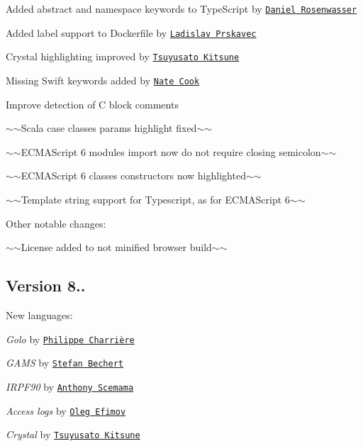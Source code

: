 \begin{DoxyItemize}
\item Added {\ttfamily abstract} and {\ttfamily namespace} keywords to Type\+Script by \href{https://github.com/DanielRosenwasser}{\tt Daniel Rosenwasser}
\item Added {\ttfamily label} support to Dockerfile by \href{https://github.com/abtris}{\tt Ladislav Prskavec}
\item Crystal highlighting improved by \href{https://github.com/MakeNowJust}{\tt Tsuyusato Kitsune}
\item Missing Swift keywords added by \href{https://github.com/natecook1000}{\tt Nate Cook}
\item Improve detection of C block comments
\item $\sim$$\sim$\+Scala case classes params highlight fixed$\sim$$\sim$
\item $\sim$$\sim$\+E\+C\+M\+A\+Script 6 modules import now do not require closing semicolon$\sim$$\sim$
\item $\sim$$\sim$\+E\+C\+M\+A\+Script 6 classes constructors now highlighted$\sim$$\sim$
\item $\sim$$\sim$\+Template string support for Typescript, as for E\+C\+M\+A\+Script 6$\sim$$\sim$
\end{DoxyItemize}

Other notable changes\+:


\begin{DoxyItemize}
\item $\sim$$\sim$\+License added to not minified browser build$\sim$$\sim$
\end{DoxyItemize}

\subsection*{Version 8..}

New languages\+:


\begin{DoxyItemize}
\item {\itshape Golo} by \href{https://github.com/k33g}{\tt Philippe Charrière}
\item {\itshape G\+A\+MS} by \href{https://github.com/b-pos465}{\tt Stefan Bechert}
\item {\itshape I\+R\+P\+F90} by \href{https://github.com/scemama}{\tt Anthony Scemama}
\item {\itshape Access logs} by \href{https://github.com/sannis}{\tt Oleg Efimov}
\item {\itshape Crystal} by \href{https://github.com/MakeNowJust}{\tt Tsuyusato Kitsune}
\end{DoxyItemize}

